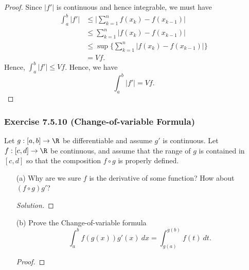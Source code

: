 \begin{enumerate}
\begin{proof}
		Since \( | f' |  \) is continuous and hence integrable, we must have
		\begin{align*}
		    \int_{ a }^{ b } | f' | &\leq \Big| \sum_{ k=1 }^{n } f(x_{k}) - f(x_{k-1}) \Big|  \\
									&\leq \sum_{ k=1 }^{ n }| f(x_{k }) - f(x_{k-1})  | \\
									&\leq \sup \Big\{ \sum_{ k=1 }^{ n }| f(x_{k }) - f(x_{k-1})  | \Big\}  \\
									&= Vf.
		\end{align*}
		Hence, \( \int_{ a }^{ b } | f' | \leq Vf \). Hence, we have 
		\[  \int_{ a }^{ b } | f' | = Vf  . \]
		\end{proof}
\end{enumerate}


\subsubsection{Exercise 7.5.10 (Change-of-variable Formula)} Let \( g: [a,b] \to \R  \) be differentiable and assume \( g' \) is continuous. Let \( f: [c,d] \to \R  \) be continuous, and assume that the range of \( g  \) is contained in \( [c,d]  \) so that the composition \( f \circ g  \) is properly defined.
\begin{enumerate}
    \item[(a)] Why are we sure \( f  \) is the derivative of some function? How about \( (f \circ g ) g' \)? 
		\begin{proof}[Solution]
		
		\end{proof}
	\item[(b)] Prove the Change-of-variable formula
		\[  \int_{ a }^{ b } f(g(x)) g'(x) \    dx = \int_{ g(a) }^{ g(b) } f(t) \  dt. \]
		\begin{proof}
		
		\end{proof}
\end{enumerate}


